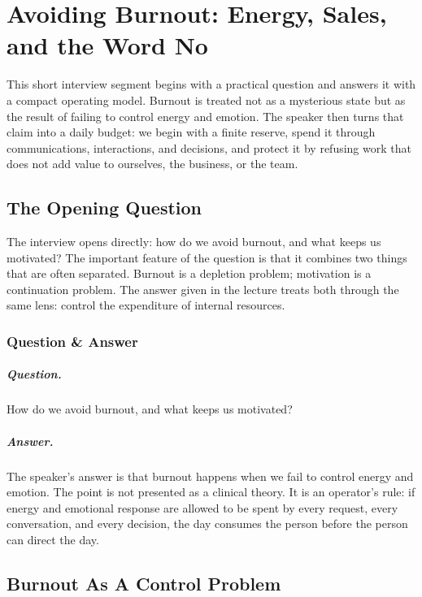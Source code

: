 \chapter{Avoiding Burnout: Energy, Sales, and the Word No}

This short interview segment begins with a practical question and answers it with a compact operating model. Burnout is treated not as a mysterious state but as the result of failing to control energy and emotion. The speaker then turns that claim into a daily budget: we begin with a finite reserve, spend it through communications, interactions, and decisions, and protect it by refusing work that does not add value to ourselves, the business, or the team.

\section{The Opening Question}

The interview opens directly: how do we avoid burnout, and what keeps us motivated? The important feature of the question is that it combines two things that are often separated. Burnout is a depletion problem; motivation is a continuation problem. The answer given in the lecture treats both through the same lens: control the expenditure of internal resources.

\subsection{Question \& Answer}

\paragraph{Question.}
How do we avoid burnout, and what keeps us motivated?

\paragraph{Answer.}
The speaker's answer is that burnout happens when we fail to control energy and emotion. The point is not presented as a clinical theory. It is an operator's rule: if energy and emotional response are allowed to be spent by every request, every conversation, and every decision, the day consumes the person before the person can direct the day.

\section{Burnout As A Control Problem}

